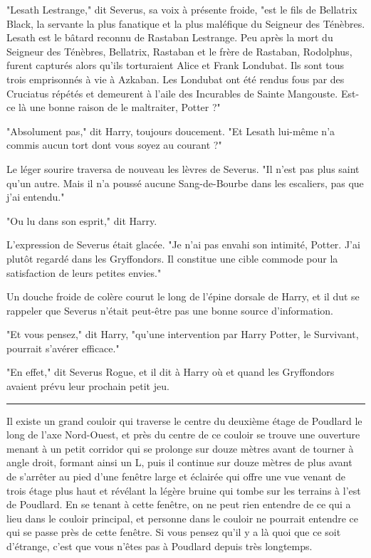 "Lesath Lestrange," dit Severus, sa voix à présente froide, "est le fils de Bellatrix Black, la servante la plus fanatique et la plus maléfique du Seigneur des Ténèbres. Lesath est le bâtard reconnu de Rastaban Lestrange. Peu après la mort du Seigneur des Ténèbres, Bellatrix, Rastaban et le frère de Rastaban, Rodolphus, furent capturés alors qu'ils torturaient Alice et Frank Londubat. Ils sont tous trois emprisonnés à vie à Azkaban. Les Londubat ont été rendus fous par des Cruciatus répétés et demeurent à l'aile des Incurables de Sainte Mangouste. Est-ce là une bonne raison de le maltraiter, Potter ?"

"Absolument pas," dit Harry, toujours doucement. "Et Lesath lui-même n'a commis aucun tort dont vous soyez au courant ?"

Le léger sourire traversa de nouveau les lèvres de Severus. "Il n'est pas plus saint qu'un autre. Mais il n'a poussé aucune Sang-de-Bourbe dans les escaliers, pas que j'ai entendu."

"Ou lu dans son esprit," dit Harry.

L'expression de Severus était glacée. "Je n'ai pas envahi son intimité, Potter. J'ai plutôt regardé dans les Gryffondors. Il constitue une cible commode pour la satisfaction de leurs petites envies."

Un douche froide de colère courut le long de l'épine dorsale de Harry, et il dut se rappeler que Severus n'était peut-être pas une bonne source d'information.

"Et vous pensez," dit Harry, "qu'une intervention par Harry Potter, le Survivant, pourrait s'avérer efficace."

"En effet," dit Severus Rogue, et il dit à Harry où et quand les Gryffondors avaient prévu leur prochain petit jeu.
\par\noindent\rule{\textwidth}{0.4pt}
Il existe un grand couloir qui traverse le centre du deuxième étage de Poudlard le long de l'axe Nord-Ouest, et près du centre de ce couloir se trouve une ouverture menant à un petit corridor qui se prolonge sur douze mètres avant de tourner à angle droit, formant ainsi un L, puis il continue sur douze mètres de plus avant de s'arrêter au pied d'une fenêtre large et éclairée qui offre une vue venant de trois étage plus haut et révélant la légère bruine qui tombe sur les terrains à l'est de Poudlard. En se tenant à cette fenêtre, on ne peut rien entendre de ce qui a lieu dans le couloir principal, et personne dans le couloir ne pourrait entendre ce qui se passe près de cette fenêtre. Si vous pensez qu'il y a là quoi que ce soit d'étrange, c'est que vous n'êtes pas à Poudlard depuis très longtemps.

